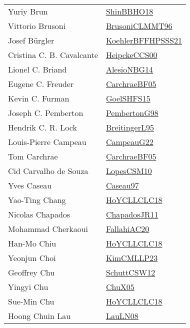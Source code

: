 {\begin{longtable}{p{4cm}p{20cm}}
Yuriy Brun & \href{articles/ShinBBHO18.pdf}{ShinBBHO18}\cite{ShinBBHO18} \\
Vittorio Brusoni & \href{papers/BrusoniCLMMT96.pdf}{BrusoniCLMMT96}\cite{BrusoniCLMMT96} \\
Josef B{\"{u}}rgler & \href{articles/KoehlerBFFHPSSS21.pdf}{KoehlerBFFHPSSS21}\cite{KoehlerBFFHPSSS21} \\
Cristina C. B. Cavalcante & \href{articles/HeipckeCCS00.pdf}{HeipckeCCS00}\cite{HeipckeCCS00} \\
Lionel C. Briand & \href{papers/AlesioNBG14.pdf}{AlesioNBG14}\cite{AlesioNBG14} \\
Eugene C. Freuder & \href{papers/CarchraeBF05.pdf}{CarchraeBF05}\cite{CarchraeBF05} \\
Kevin C. Furman & \href{articles/GoelSHFS15.pdf}{GoelSHFS15}\cite{GoelSHFS15} \\
Joseph C. Pemberton & \href{papers/PembertonG98.pdf}{PembertonG98}\cite{PembertonG98} \\
Hendrik C. R. Lock & \href{}{BreitingerL95}\cite{BreitingerL95} \\
Louis{-}Pierre Campeau & \href{articles/CampeauG22.pdf}{CampeauG22}\cite{CampeauG22} \\
Tom Carchrae & \href{papers/CarchraeBF05.pdf}{CarchraeBF05}\cite{CarchraeBF05} \\
Cid Carvalho de Souza & \href{articles/LopesCSM10.pdf}{LopesCSM10}\cite{LopesCSM10} \\
Yves Caseau & \href{papers/Caseau97.pdf}{Caseau97}\cite{Caseau97} \\
Yao{-}Ting Chang & \href{papers/HoYCLLCLC18.pdf}{HoYCLLCLC18}\cite{HoYCLLCLC18} \\
Nicolas Chapados & \href{papers/ChapadosJR11.pdf}{ChapadosJR11}\cite{ChapadosJR11} \\
Mohammad Cherkaoui & \href{}{FallahiAC20}\cite{FallahiAC20} \\
Han{-}Mo Chiu & \href{papers/HoYCLLCLC18.pdf}{HoYCLLCLC18}\cite{HoYCLLCLC18} \\
Yeonjun Choi & \href{papers/KimCMLLP23.pdf}{KimCMLLP23}\cite{KimCMLLP23} \\
Geoffrey Chu & \href{papers/SchuttCSW12.pdf}{SchuttCSW12}\cite{SchuttCSW12} \\
Yingyi Chu & \href{papers/ChuX05.pdf}{ChuX05}\cite{ChuX05} \\
Sue{-}Min Chu & \href{papers/HoYCLLCLC18.pdf}{HoYCLLCLC18}\cite{HoYCLLCLC18} \\
Hoong Chuin Lau & \href{papers/LauLN08.pdf}{LauLN08}\cite{LauLN08} \\

\end{longtable}}
